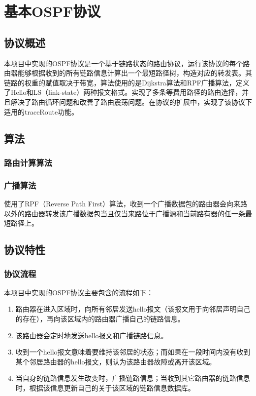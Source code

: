 \section{基本OSPF协议} %
\label{sec:ospf}
	\subsection{协议概述} %
	\label{sub:协议概述}
		本项目中实现的OSPF协议是一个基于链路状态的路由协议，运行该协议的每个路由器能够根据收到的所有链路信息计算出一个最短路径树，构造对应的转发表。其链路的权重的赋值取决于带宽，算法使用的是Dijkstra算法和RPF广播算法，定义了Hello和LS（link-state）两种报文格式。实现了多条等费用路径的路由选择，并且解决了路由循环问题和改善了路由震荡问题。在协议的扩展中，实现了该协议下适用的traceRoute功能。
	\subsection{算法} %
	\label{sub:算法}
		\subsubsection{路由计算算法} %
		\label{ssub:路由计算算法}
		
		\subsubsection{广播算法} %
		\label{ssub:广播算法}
			使用了RPF（Reverse Path First）算法，收到一个广播数据包的路由器会向来路以外的路由器转发该广播数据包当且仅当来路位于广播源和当前路有器的任一条最短路径上。
	\subsection{协议特性} %
	\label{sub:协议特性}
		\subsubsection{协议流程} %
		\label{ssub:协议流程}
		本项目中实现的OSPF协议主要包含的流程如下：
		\begin{enumerate}
			\item 路由器在进入区域时，向所有邻居发送hello报文（该报文用于向邻居声明自己的存在），再向该区域内的路由器广播自己的链路信息。
			\item 该路由器会定时地发送hello报文和广播链路信息。
			\item 收到一个hello报文意味着要维持该邻居的状态；而如果在一段时间内没有收到某个邻居路由器的hello报文，则认为该路由器故障或离开该区域。
			\item 当自身的链路信息发生改变时，广播链路信息；当收到其它路由器的链路信息时，根据该信息更新自己的关于该区域的链路信息数据库。
		\end{enumerate}		
